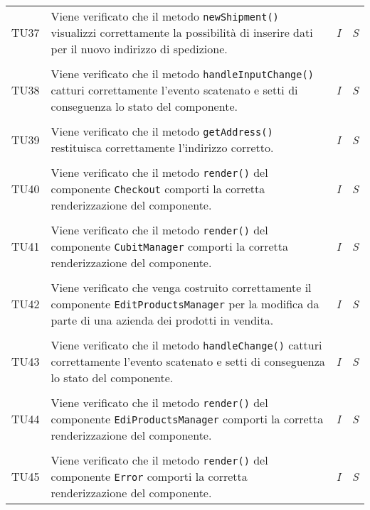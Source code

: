 \begin{longtable}{ >{\centering}p{} >{}p{}
				>{\centering}p{} >{\centering}p{}}
			\tabularnewline
			\hypertarget{TU37}{TU37} & Viene verificato che il metodo 
			\texttt{newShipment()} visualizzi correttamente la possibilità di 
			inserire dati per il nuovo indirizzo di spedizione. & 
			\textit{I} & 
			\textit{S}\\
			
			\tabularnewline
			\hypertarget{TU38}{TU38} & Viene verificato che il metodo 
			\texttt{handleInputChange()} catturi correttamente l'evento 
			scatenato e setti di conseguenza lo stato del componente. & 
			\textit{I} & 
			\textit{S}\\
			
			\tabularnewline
			\hypertarget{TU39}{TU39} & Viene verificato che il metodo 
			\texttt{getAddress()} restituisca correttamente l'indirizzo 
			corretto. & 
			\textit{I} & 
			\textit{S}\\
			
			\tabularnewline
			\hypertarget{TU40}{TU40} & Viene verificato che il metodo 
			\texttt{render()} del componente \texttt{Checkout} comporti la 
			corretta renderizzazione del componente. & 
			\textit{I} & 
			\textit{S}\\
			
			\tabularnewline
			\hypertarget{TU41}{TU41} & Viene verificato che il metodo 
			\texttt{render()} del componente \texttt{CubitManager} comporti la 
			corretta renderizzazione del componente. & 
			\textit{I} & 
			\textit{S}\\
			
			\tabularnewline
			\hypertarget{TU42}{TU42} & Viene verificato che venga costruito 
			correttamente il componente \texttt{EditProductsManager} per la 
			modifica da parte di una azienda dei prodotti in vendita. & 
			\textit{I} & 
			\textit{S}\\
			
			\tabularnewline
			\hypertarget{TU43}{TU43} & Viene verificato che il metodo 
			\texttt{handleChange()} catturi correttamente l'evento scatenato e 
			setti di conseguenza lo stato del componente. & 
			\textit{I} & 
			\textit{S}\\                    
			
			\tabularnewline
			\hypertarget{TU44}{TU44} & Viene verificato che il metodo 
			\texttt{render()} del componente \texttt{EdiProductsManager} 
			comporti la corretta renderizzazione del componente. & 
			\textit{I} & 
			\textit{S}\\
			
			\tabularnewline
			\hypertarget{TU45}{TU45} & Viene verificato che il metodo 
			\texttt{render()} del componente \texttt{Error} comporti la 
			corretta renderizzazione del componente. & 
			\textit{I} & 
			\textit{S}\\
			

\end{longtable}
